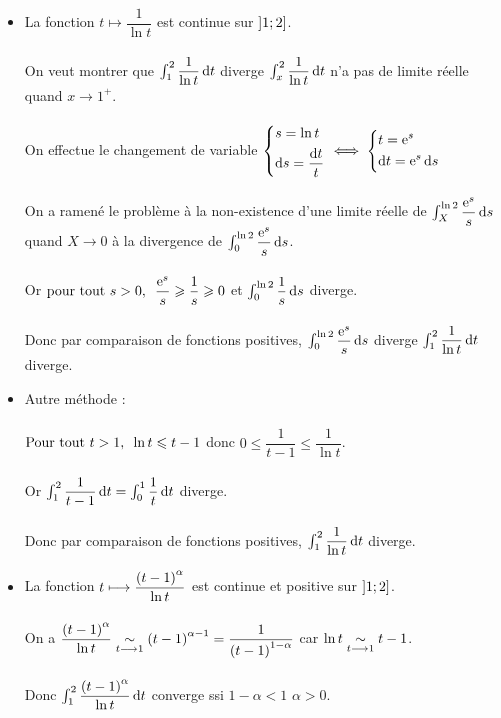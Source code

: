 \begin{corr}
\begin{itemize}
    \item La fonction \(t\mapsto\dfrac{1}{\ln t}\) est continue sur \(\left]1;2\right]\). \\\\ On veut montrer que \(\int_1^2\dfrac{1}{\ln t}\odif{t}\) diverge \ie \(\int_x^2\dfrac{1}{\ln t}\odif{t}\) n'a pas de limite réelle quand \(x\to1^+\). \\\\ On effectue le changement de variable \(\begin{dcases}
        s=\ln t \\
        \odif{s}=\dfrac{\odif{t}}{t}
    \end{dcases}\ssi\begin{dcases}
        t=\e{s} \\
        \odif{t}=\e{s}\odif{s}
    \end{dcases}\) \\\\ On a ramené le problème à la non-existence d'une limite réelle de \(\int_X^{\ln2}\dfrac{\e{s}}{s}\odif{s}\) quand \(X\to0\) \ie à la divergence de \(\int_0^{\ln2}\dfrac{\e{s}}{s}\odif{s}\). \\\\ Or \(\quantifs{\tpt s>0}\dfrac{\e{s}}{s}\geq\dfrac{1}{s}\geq0\) et \(\int_0^{\ln2}\dfrac{1}{s}\odif{s}\) diverge. \\\\ Donc par comparaison de fonctions positives, \(\int_0^{\ln2}\dfrac{\e{s}}{s}\odif{s}\) diverge \ie \(\int_1^2\dfrac{1}{\ln t}\odif{t}\) diverge. \\
    \item Autre méthode : \\\\ \(\quantifs{\Tpt t>1}\ln t\leq t-1\) donc \(0\leq\dfrac{1}{t-1}\leq\dfrac{1}{\ln t}\). \\\\ Or \(\int_1^2\dfrac{1}{t-1}\odif{t}=\int_0^1\dfrac{1}{t}\odif{t}\) diverge. \\\\ Donc par comparaison de fonctions positives, \(\int_1^2\dfrac{1}{\ln t}\odif{t}\) diverge. \\
    \item La fonction \(t\longmapsto\dfrac{\left(t-1\right)^\alpha}{\ln t}\) est continue et positive sur \(\left]1;2\right]\). \\\\ On a \(\dfrac{\left(t-1\right)^\alpha}{\ln t}\underset{t\longrightarrow1}{\sim}\left(t-1\right)^{\alpha-1}=\dfrac{1}{\left(t-1\right)^{1-\alpha}}\) car \(\ln t\underset{t\longrightarrow1}{\sim}t-1\). \\\\ Donc \(\int_1^2\dfrac{\paren{t-1}^\alpha}{\ln t}\odif{t}\) converge ssi \(1-\alpha<1\) \ie \(\alpha>0\).
\end{itemize}
\end{corr}

